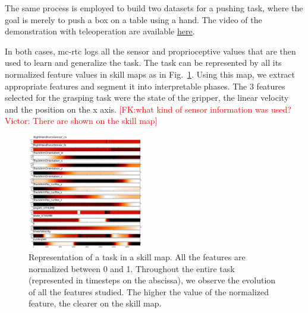 \documentclass[conference]{IEEEtran}
\newcommand{\fk}[1]{\textcolor{red}{[FK:#1]}}
\begin{document}
 The same process is employed to build two datasets for a pushing task, where the goal is merely to push a box on a table using a hand. The video of the demonstration with teleoperation are available \href{https://github.com/VictorBbt/Article_TaskGeneralization}{here}.

 In both cases, mc-rtc logs all the sensor and proprioceptive values that are then used to learn and generalize the task. The task can be represented by all its normalized feature values in skill maps as in Fig.~\ref{fig:skillmap}. Using this map, we extract appropriate features and segment it into interpretable phases. The 3 features selected for the grasping task were the state of the gripper, the linear velocity and the position on the x axis. %
\fk{what kind of sensor information was used? \newline
Victor: There are shown on the skill map}

 \begin{figure}[t]
  \centering
  \includegraphics[width=0.45\textwidth]{img/skillMap.png}
  \caption{Representation of a task in a skill map. All the features are normalized between 0 and 1. Throughout the entire task (represented in timesteps on the abscissa), we observe the evolution of all the features studied. The higher the value of the normalized feature, the clearer on the skill map.}
  \label{fig:skillmap}
\end{figure}
\end{document}

